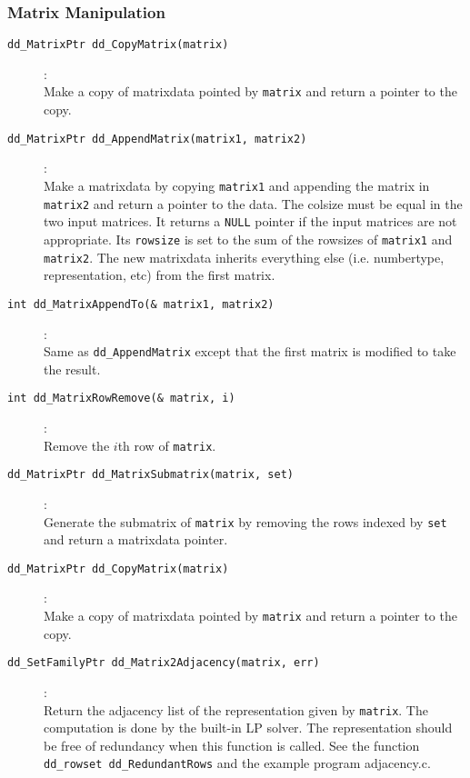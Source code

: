 \documentclass[11pt]{article}
\newcommand {\0} {{\bf 0}}
\begin{document}
\subsubsection{Matrix Manipulation}
\begin{description}

\item[{\tt dd\_MatrixPtr dd\_CopyMatrix(matrix)}]:\\
Make a copy of matrixdata pointed by {\tt matrix} and return
a pointer to the copy.

\item[{\tt dd\_MatrixPtr dd\_AppendMatrix(matrix1, matrix2)}]:\\
Make a matrixdata by copying {\tt *matrix1} and appending
the matrix in {\tt *matrix2} and return
a pointer to the data.  The colsize must be equal in
the two input matrices.  It returns a {\tt NULL} pointer
if the input matrices are not appropriate.
Its {\tt rowsize} is set to
the sum of the rowsizes of {\tt matrix1} and {\tt matrix2}.
 The new matrixdata inherits everything else
(i.e. numbertype, representation, etc)
from the first matrix. 

\item[{\tt int dd\_MatrixAppendTo(\& matrix1, matrix2)}]:\\
Same as {\tt dd\_AppendMatrix} except that the first matrix
is modified to take the result.

\item[{\tt int dd\_MatrixRowRemove(\& matrix, i)}]:\\
Remove the $i$th row of {\tt matrix}.

\item[{\tt dd\_MatrixPtr dd\_MatrixSubmatrix(matrix, set)}]:\\
Generate the submatrix of {\tt matrix} by removing the
rows indexed by {\tt set} and return a matrixdata pointer.

\item[{\tt dd\_MatrixPtr dd\_CopyMatrix(matrix)}]:\\
Make a copy of matrixdata pointed by {\tt matrix} and return
a pointer to the copy.

\item[{\tt  dd\_SetFamilyPtr dd\_Matrix2Adjacency(matrix, err)}]:\\
Return the adjacency list of the representation given by {\tt matrix}.
The computation is done by the built-in LP solver.  The representation
should be free of redundancy when this function is called. 
See the function  {\tt dd\_rowset dd\_RedundantRows}
and the example program adjacency.c.

\end{description}
\end{document}
